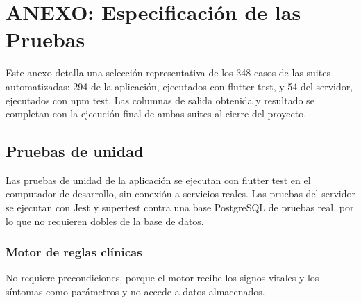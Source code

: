 \chapter[Anexo: Especificación de las Pruebas]{ANEXO: Especificación de las Pruebas}

Este anexo detalla una selección representativa de los 348 casos de las suites
automatizadas: 294 de la aplicación, ejecutados con flutter test, y 54 del
servidor, ejecutados con npm test. Las columnas de salida obtenida y resultado
se completan con la ejecución final de ambas suites al cierre del proyecto.

\section[Pruebas de Unidad]{Pruebas de unidad}

Las pruebas de unidad de la aplicación se ejecutan con flutter test en el
computador de desarrollo, sin conexión a servicios reales. Las pruebas del
servidor se ejecutan con Jest y supertest contra una base PostgreSQL de pruebas
real, por lo que no requieren dobles de la base de datos.

\subsection{Motor de reglas clínicas}

No requiere precondiciones, porque el motor recibe los signos vitales y los
síntomas como parámetros y no accede a datos almacenados.

